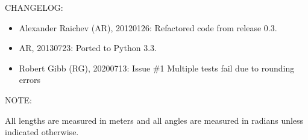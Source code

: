 \documentclass[a4paper,12ptopenany,oneside,english]{sphinxmanual}
\begin{document}
\sphinxAtStartPar
CHANGELOG:
\begin{itemize}
\item {} 
\sphinxAtStartPar
Alexander Raichev (AR), 2012\sphinxhyphen{}01\sphinxhyphen{}26: Refactored code from release 0.3.

\item {} 
\sphinxAtStartPar
AR, 2013\sphinxhyphen{}07\sphinxhyphen{}23: Ported to Python 3.3.

\item {} 
\sphinxAtStartPar
Robert Gibb (RG), 2020\sphinxhyphen{}07\sphinxhyphen{}13: Issue \#1 Multiple tests fail due to rounding errors

\end{itemize}

\sphinxAtStartPar
NOTE:

\sphinxAtStartPar
All lengths are measured in meters and all angles are measured in radians
unless indicated otherwise.
\end{document}
